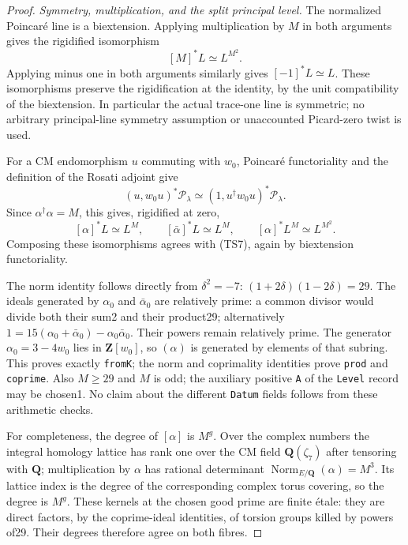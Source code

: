 \documentclass[11pt,a4paper]{article}
\theoremstyle{definition}\newtheorem{remark}[theorem]{Remark}
\begin{document}
\begin{proof}
\emph{Symmetry, multiplication, and the split principal level.}
The normalized Poincaré line is a biextension. Applying multiplication by \(M\) in both arguments gives the rigidified isomorphism \[
 [M]^*L\simeq L^{M^2}.
 \tag{TS7}
\] Applying minus one in both arguments similarly gives \([-1]^*L\simeq L\). These isomorphisms preserve the rigidification at the identity, by the unit compatibility of the biextension. In particular the actual trace-one line is symmetric; no arbitrary principal-line symmetry assumption or unaccounted Picard-zero twist is used.

For a CM endomorphism \(u\) commuting with \(w_0\), Poincaré functoriality and the definition of the Rosati adjoint give \[
 (u,w_0u)^*\mathcal P_\lambda
 \simeq (1,u^\dagger w_0u)^*\mathcal P_\lambda.
\] Since \(\alpha^\dagger\alpha=M\), this gives, rigidified at zero, \[
 [\alpha]^*L\simeq L^M,
 \qquad [\bar\alpha]^*L\simeq L^M,
 \qquad [\alpha]^*L^M\simeq L^{M^2}.
 \tag{TS8}
\] Composing these isomorphisms agrees with (TS7), again by biextension functoriality.

The norm identity follows directly from \(\delta^2=-7\): \((1+2\delta)(1-2\delta)=29\). The ideals generated by \(\alpha_0\) and \(\bar\alpha_0\) are relatively prime: a common divisor would divide both their sum2 and their product29; alternatively \(1=15(\alpha_0+\bar\alpha_0)-\alpha_0\bar\alpha_0\). Their powers remain relatively prime. The generator \(\alpha_0=3-4w_0\) lies in \(\mathbf Z[w_0]\), so \((\alpha)\) is generated by elements of that subring. This proves exactly \texttt{fromK}; the norm and coprimality identities prove \texttt{prod} and \texttt{coprime}. Also \(M\ge29\) and \(M\) is odd; the auxiliary positive \texttt{A} of the \texttt{Level} record may be chosen1. No claim about the different \texttt{Datum} fields follows from these arithmetic checks.

For completeness, the degree of \([\alpha]\) is \(M^g\). Over the complex numbers the integral homology lattice has rank one over the CM field \(\mathbf Q(\zeta_7)\) after tensoring with \(\mathbf Q\); multiplication by \(\alpha\) has rational determinant \(\operatorname{Norm}_{E/\mathbf Q}(\alpha)=M^3\). Its lattice index is the degree of the corresponding complex torus covering, so the degree is \(M^g\). These kernels at the chosen good prime are finite étale: they are direct factors, by the coprime-ideal identities, of torsion groups killed by powers of29. Their degrees therefore agree on both fibres.


\end{proof}
\end{document}
